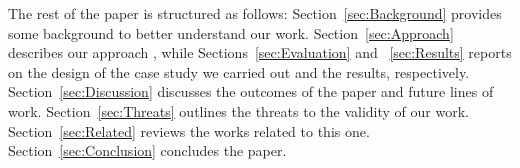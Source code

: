 The rest of the paper is structured as follows: Section~\ref{sec:Background} provides some background to better understand our work. Section~\ref{sec:Approach} describes our approach \ApproachName{}, while Sections~\ref{sec:Evaluation} and ~\ref{sec:Results} reports on the design of the case study we carried out and the results, respectively. Section~\ref{sec:Discussion} discusses the outcomes of the paper and future lines of work. Section~\ref{sec:Threats} outlines the threats to the validity of our work. Section~\ref{sec:Related} reviews the works related to this one.
Section~\ref{sec:Conclusion} concludes the paper.